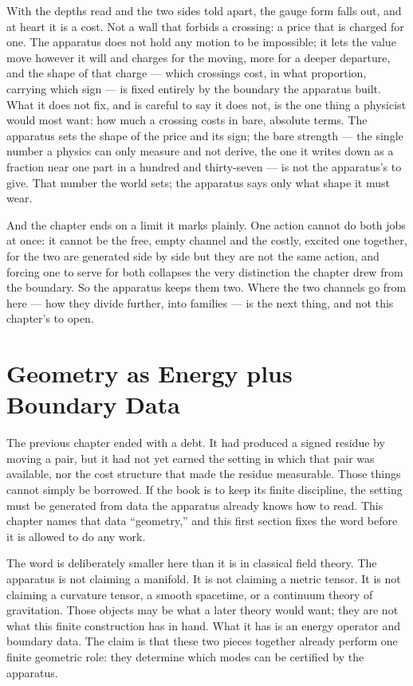 With the depths read and the two sides told apart, the gauge form falls out, and at heart it is a cost. Not a wall that forbids a crossing: a price that is charged for one. The apparatus does not hold any motion to be impossible; it lets the value move however it will and charges for the moving, more for a deeper departure, and the shape of that charge --- which crossings cost, in what proportion, carrying which sign --- is fixed entirely by the boundary the apparatus built. What it does not fix, and is careful to say it does not, is the one thing a physicist would most want: how much a crossing costs in bare, absolute terms. The apparatus sets the shape of the price and its sign; the bare strength --- the single number a physics can only measure and not derive, the one it writes down as a fraction near one part in a hundred and thirty-seven --- is not the apparatus's to give. That number the world sets; the apparatus says only what shape it must wear.

And the chapter ends on a limit it marks plainly. One action cannot do both jobs at once: it cannot be the free, empty channel and the costly, excited one together, for the two are generated side by side but they are not the same action, and forcing one to serve for both collapses the very distinction the chapter drew from the boundary. So the apparatus keeps them two. Where the two channels go from here --- how they divide further, into families --- is the next thing, and not this chapter's to open.

\section{Geometry as Energy plus Boundary Data}

The previous chapter ended with a debt. It had produced a signed residue by moving a
pair, but it had not yet earned the setting in which that pair was available, nor the
cost structure that made the residue measurable. Those things cannot simply be
borrowed. If the book is to keep its finite discipline, the setting must be generated
from data the apparatus already knows how to read. This chapter names that data
``geometry,'' and this first section fixes the word before it is allowed to do any
work.

The word is deliberately smaller here than it is in classical field theory. The
apparatus is not claiming a manifold. It is not claiming a metric tensor. It is not
claiming a curvature tensor, a smooth spacetime, or a continuum theory of gravitation.
Those objects may be what a later theory would want; they are not what this finite
construction has in hand. What it has is an energy operator and boundary data. The
claim is that these two pieces together already perform one finite geometric role:
they determine which modes can be certified by the apparatus.

